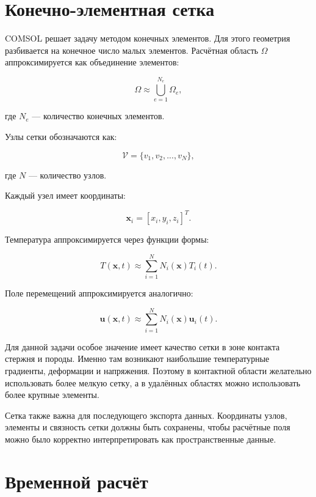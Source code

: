 \section{Конечно-элементная сетка}

COMSOL решает задачу методом конечных элементов. Для этого геометрия разбивается на конечное число малых элементов. Расчётная область $\Omega$ аппроксимируется как объединение элементов:

\begin{equation}
\Omega\approx\bigcup_{e=1}^{N_e}\Omega_e,
\end{equation}

где $N_e$ --- количество конечных элементов.

Узлы сетки обозначаются как:

\begin{equation}
\mathcal{V}=\{v_1,v_2,...,v_N\},
\end{equation}

где $N$ --- количество узлов.

Каждый узел имеет координаты:

\begin{equation}
\mathbf{x}_i=[x_i,y_i,z_i]^T.
\end{equation}

Температура аппроксимируется через функции формы:

\begin{equation}
T(\mathbf{x},t)\approx\sum_{i=1}^{N}N_i(\mathbf{x})T_i(t).
\end{equation}

Поле перемещений аппроксимируется аналогично:

\begin{equation}
\mathbf{u}(\mathbf{x},t)\approx\sum_{i=1}^{N}N_i(\mathbf{x})\mathbf{u}_i(t).
\end{equation}

Для данной задачи особое значение имеет качество сетки в зоне контакта стержня и породы. Именно там возникают наибольшие температурные градиенты, деформации и напряжения. Поэтому в контактной области желательно использовать более мелкую сетку, а в удалённых областях можно использовать более крупные элементы.

Сетка также важна для последующего экспорта данных. Координаты узлов, элементы и связность сетки должны быть сохранены, чтобы расчётные поля можно было корректно интерпретировать как пространственные данные.

\section{Временной расчёт}

